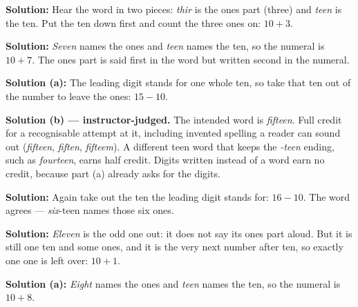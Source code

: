 \documentclass[12pt]{article}
\begin{document}




\textbf{Solution:} Hear the word in two pieces: \emph{thir} is the ones part (three) and \emph{teen} is the ten. Put the ten down first and count the three ones on: $10 + 3$. 


\textbf{Solution:} \emph{Seven} names the ones and \emph{teen} names the ten, so the numeral is $10 + 7$. The ones part is said first in the word but written second in the numeral. 


\textbf{Solution (a):} The leading digit stands for one whole ten, so take that ten out of the number to leave the ones: $15 - 10$. 

\textbf{Solution (b) --- instructor-judged.} The intended word is \emph{fifteen}. Full credit for a recognisable attempt at it, including invented spelling a reader can sound out (\emph{fifteen}, \emph{fiften}, \emph{fifteem}). A different teen word that keeps the \emph{-teen} ending, such as \emph{fourteen}, earns half credit. Digits written instead of a word earn no credit, because part (a) already asks for the digits.


\textbf{Solution:} Again take out the ten the leading digit stands for: $16 - 10$. The word agrees --- \emph{six}-teen names those six ones. 


\textbf{Solution:} \emph{Eleven} is the odd one out: it does not say its ones part aloud. But it is still one ten and some ones, and it is the very next number after ten, so exactly one one is left over: $10 + 1$. 


\textbf{Solution (a):} \emph{Eight} names the ones and \emph{teen} names the ten, so the numeral is $10 + 8$. 
\end{document}
